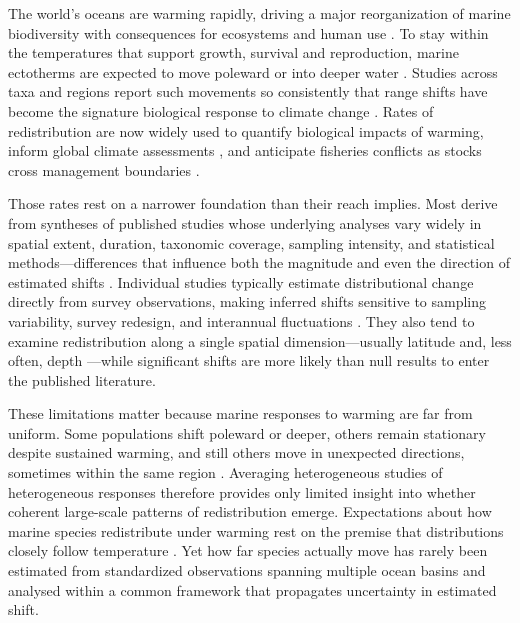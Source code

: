 \documentclass[9pt,twocolumn,twoside]{pnas-new}
\begin{document}
The world's oceans are warming rapidly, driving a major reorganization of marine biodiversity with consequences for ecosystems and human use \citep{ipcc_ocean_2022, pecl_biodiversity_2017}. To stay within the temperatures that support growth, survival and reproduction, marine ectotherms are expected to move poleward or into deeper water \citep{sundayThermalToleranceGlobal2012}. Studies across taxa and regions report such movements so consistently that range shifts have become the signature biological response to climate change \citep{parmesan_globally_2003, parmesan_ecological_2006, poloczanska_global_2013, poloczanska_responses_2016}. Rates of redistribution are now widely used to quantify biological impacts of warming, inform global climate assessments \citep{ipcc_ocean_2022, poloczanska_responses_2016}, and anticipate fisheries conflicts as stocks cross management boundaries \citep{pinsky_preparing_2018, palacios-abrantes_climate_2025}.
 
Those rates rest on a narrower foundation than their reach implies. Most derive from syntheses of published studies whose underlying analyses vary widely in spatial extent, duration, taxonomic coverage, sampling intensity, and statistical methods---differences that influence both the magnitude and even the direction of estimated shifts \citep{poloczanska_global_2013, brown_ecological_2016, lenoir_species_2020, lawlor_mechanisms_2024}. Individual studies typically estimate distributional change directly from survey observations, making inferred shifts sensitive to sampling variability, survey redesign, and interannual fluctuations \citep{thorson_model-based_2016}. They also tend to examine redistribution along a single spatial dimension---usually latitude and, less often, depth \citep{lenoir_climate-related_2015}---while significant shifts are more likely than null results to enter the published literature.

These limitations matter because marine responses to warming are far from uniform. Some populations shift poleward or deeper, others remain stationary despite sustained warming, and still others move in unexpected directions, sometimes within the same region \citep{rubenstein_climate_2023, fuchs_wrong-way_2020, lawlor_mechanisms_2024}. Averaging heterogeneous studies of heterogeneous responses therefore provides only limited insight into whether coherent large-scale patterns of redistribution emerge. Expectations about how marine species redistribute under warming rest on the premise that distributions closely follow temperature \citep{sundayThermalToleranceGlobal2012, burrows_pace_2011}. Yet how far species actually move has rarely been estimated from standardized observations spanning multiple ocean basins \Parasplit and analysed within a common framework that propagates uncertainty in estimated shift.
\end{document}
